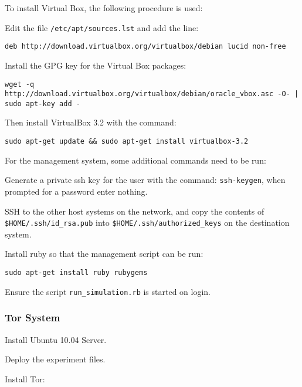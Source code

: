 To install Virtual Box, the following procedure is used:

\begin{enumerate*}
  \item Edit the file \verb+/etc/apt/sources.lst+ and add the line:
  \begin{verbatim}
deb http://download.virtualbox.org/virtualbox/debian lucid non-free
  \end{verbatim}
  \item Install the GPG key for the Virtual Box packages:
  \begin{verbatim}
wget -q http://download.virtualbox.org/virtualbox/debian/oracle_vbox.asc -O- | sudo apt-key add -
  \end{verbatim}
  \item Then install VirtualBox 3.2 with the command:
  \begin{verbatim}
sudo apt-get update && sudo apt-get install virtualbox-3.2
  \end{verbatim}
\end{enumerate*}

For the management system, some additional commands need to be run:

\begin{enumerate*}
  \item Generate a private ssh key for the user with the command: \verb+ssh-keygen+, when prompted for a password enter nothing.
  \item SSH to the other host systems on the network, and copy the contents of \verb+$HOME/.ssh/id_rsa.pub+ into \verb+$HOME/.ssh/authorized_keys+ on the destination system.
  \item Install ruby so that the management script can be run:
    \begin{verbatim}
sudo apt-get install ruby rubygems
    \end{verbatim}
  \item Ensure the script \verb+run_simulation.rb+ is started on login.
\end{enumerate*}

\subsubsection{Tor System}

Install Ubuntu 10.04 Server.

Deploy the experiment files.

Install Tor:

